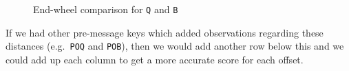 \begin{figure}[H]
  \begin{center}
  \end{center}
  \caption{End-wheel comparison for \texttt{Q} and \texttt{B}}
\end{figure}

\noindent If we had other pre-message keys which added observations
regarding these distances (e.g.\ \texttt{POQ} and \texttt{POB}),
then we would add another row below this and we could add up each
column to get a more accurate score for each offset.

